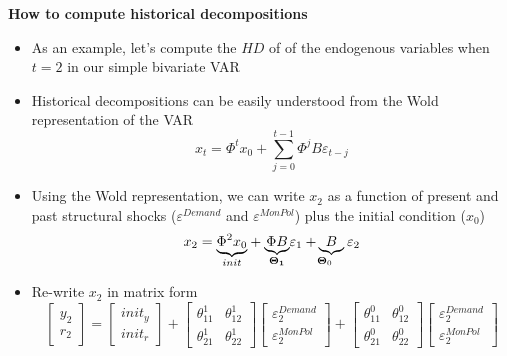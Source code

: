 \documentclass[10pt,english,t,aspectratio=169,ignorenonframetext]{beamer}
\begin{document}
\begin{frame}
{\textbf{How to compute historical decompositions }}

\begin{itemize}
\item As an example, let's compute the $HD$ of of the endogenous variables
when $t=2$ in our simple bivariate VAR\bigskip

\item Historical decompositions can be easily understood from the Wold
representation of the VAR%
\begin{equation*}
x_{t}={\Phi ^{t}x_{0}}+{\sum\limits_{j=0}^{t-1}\Phi ^{j}B\varepsilon _{t-j}}
\end{equation*}%
\vspace{-.1cm}\pause

\item Using the Wold representation, we can write $x_{2}$ as a function of
present and past structural shocks ($\varepsilon ^{Demand}$ and $\varepsilon
^{MonPol}$) plus the initial condition ($x_{0}$)%
\begin{equation*}
x_{2}=\underset{init}{\underbrace{\Phi ^{2}x_{0}}}+\underset{\boldsymbol{%
\Theta }_{\boldsymbol{1}}}{\underbrace{\Phi B}}\varepsilon _{1}\underset{%
\boldsymbol{\Theta }_{0}}{+\underbrace{B}}\varepsilon _{2}
\end{equation*}%
\vspace{-.1cm}\pause

\item Re-write $x_{2}$ in matrix form 
\begin{equation*}
\begin{bmatrix}
y_{2} \\ 
r_{2}%
\end{bmatrix}%
=%
\begin{bmatrix}
init_{y} \\ 
init_{r}%
\end{bmatrix}%
+%
\begin{bmatrix}
\theta _{11}^{1} & \theta _{12}^{1} \\ 
\theta _{21}^{1} & \theta _{22}^{1}%
\end{bmatrix}%
\begin{bmatrix}
\varepsilon _{2}^{Demand} \\ 
\varepsilon _{2}^{MonPol}%
\end{bmatrix}%
+%
\begin{bmatrix}
\theta _{11}^{0} & \theta _{12}^{0} \\ 
\theta _{21}^{0} & \theta _{22}^{0}%
\end{bmatrix}%
\begin{bmatrix}
\varepsilon _{2}^{Demand} \\ 
\varepsilon _{2}^{MonPol}%
\end{bmatrix}%
\end{equation*}
\end{itemize}
\end{frame}
\end{document}
